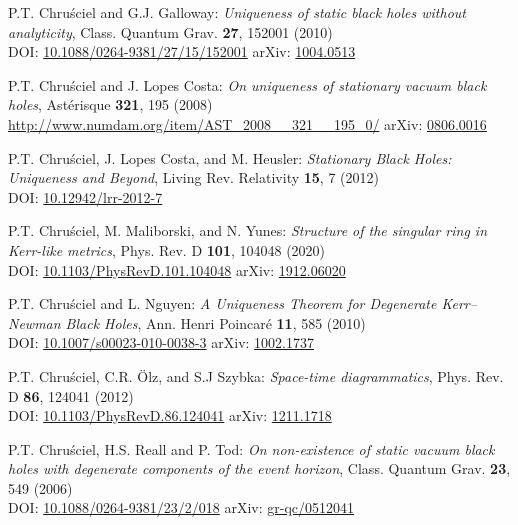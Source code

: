 \begin{thebibliography}{123}
P.T. Chru\'sciel and G.J. Galloway:
{\em Uniqueness of static black holes without analyticity},
Class. Quantum Grav. {\bf 27}, 152001 (2010)\\
DOI: \href{https://doi.org/10.1088/0264-9381/27/15/152001}{10.1088/0264-9381/27/15/152001}\hfill
arXiv: \href{https://arxiv.org/abs/1004.0513}{1004.0513}

P.T. Chru\'sciel and J. Lopes Costa:
{\em On uniqueness of stationary vacuum black holes},
Astérisque {\bf 321}, 195 (2008)\\
\url{http://www.numdam.org/item/AST_2008__321__195_0/}\hfill
arXiv: \href{https://arxiv.org/abs/0806.0016}{0806.0016}

P.T. Chru\'sciel, J. Lopes Costa, and M. Heusler:
{\em Stationary Black Holes: Uniqueness and Beyond},
Living Rev. Relativity {\bf 15}, 7 (2012)\\
DOI: \href{https://doi.org/10.12942/lrr-2012-7}{10.12942/lrr-2012-7}

P.T. Chru\'sciel, M. Maliborski, and N. Yunes:
{\em Structure of the singular ring in Kerr-like metrics},
Phys. Rev. D {\bf 101}, 104048 (2020)\\
DOI: \href{https://doi.org/10.1103/PhysRevD.101.104048}{10.1103/PhysRevD.101.104048}\hfill
arXiv: \href{https://arxiv.org/abs/1912.06020}{1912.06020}

P.T. Chru\'sciel and L. Nguyen:
{\em A Uniqueness Theorem for Degenerate Kerr–Newman Black Holes},
Ann. Henri Poincar\'e {\bf 11}, 585 (2010)\\
DOI: \href{https://doi.org/10.1007/s00023-010-0038-3}{10.1007/s00023-010-0038-3}\hfill
arXiv: \href{https://arxiv.org/abs/1002.1737}{1002.1737}

P.T. Chru\'sciel, C.R. Ölz, and S.J Szybka:
{\em Space-time diagrammatics},
Phys. Rev. D {\bf 86}, 124041 (2012)\\
DOI:  \href{https://doi.org/10.1103/PhysRevD.86.124041}{10.1103/PhysRevD.86.124041}\hfill
arXiv: \href{https://arxiv.org/abs/1211.1718}{1211.1718}

P.T. Chru\'sciel, H.S. Reall and P. Tod:
{\em On non-existence of static vacuum black holes with degenerate components of the event horizon},
Class. Quantum Grav. {\bf 23}, 549 (2006)\\
DOI: \href{https://doi.org/10.1088/0264-9381/23/2/018}{10.1088/0264-9381/23/2/018}\hfill
arXiv: \href{https://arxiv.org/abs/gr-qc/0512041}{gr-qc/0512041}


\end{thebibliography}
